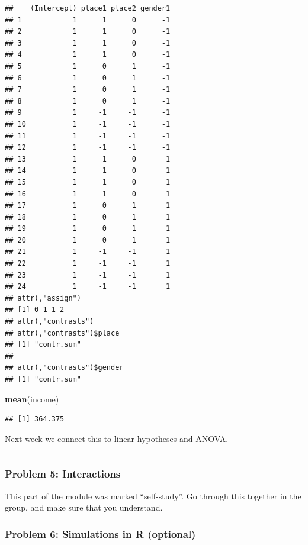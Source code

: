 \documentclass[
]{article}
\newenvironment{Shaded}{\begin{snugshade}}{\end{snugshade}}
\newcommand{\FunctionTok}[1]{\textcolor[rgb]{0.13,0.29,0.53}{\textbf{#1}}}
\newcommand{\NormalTok}[1]{#1}
\begin{document}
\begin{verbatim}
##    (Intercept) place1 place2 gender1
## 1            1      1      0      -1
## 2            1      1      0      -1
## 3            1      1      0      -1
## 4            1      1      0      -1
## 5            1      0      1      -1
## 6            1      0      1      -1
## 7            1      0      1      -1
## 8            1      0      1      -1
## 9            1     -1     -1      -1
## 10           1     -1     -1      -1
## 11           1     -1     -1      -1
## 12           1     -1     -1      -1
## 13           1      1      0       1
## 14           1      1      0       1
## 15           1      1      0       1
## 16           1      1      0       1
## 17           1      0      1       1
## 18           1      0      1       1
## 19           1      0      1       1
## 20           1      0      1       1
## 21           1     -1     -1       1
## 22           1     -1     -1       1
## 23           1     -1     -1       1
## 24           1     -1     -1       1
## attr(,"assign")
## [1] 0 1 1 2
## attr(,"contrasts")
## attr(,"contrasts")$place
## [1] "contr.sum"
## 
## attr(,"contrasts")$gender
## [1] "contr.sum"
\end{verbatim}

\begin{Shaded}
\begin{Highlighting}[]
\FunctionTok{mean}\NormalTok{(income)}
\end{Highlighting}
\end{Shaded}

\begin{verbatim}
## [1] 364.375
\end{verbatim}

Next week we connect this to linear hypotheses and ANOVA.

\begin{center}\rule{0.5\linewidth}{0.5pt}\end{center}

\hypertarget{problem-5-interactions}{%
\subsubsection{Problem 5: Interactions}\label{problem-5-interactions}}

This part of the module was marked ``self-study''. Go through this
together in the group, and make sure that you understand.

\hypertarget{problem-6-simulations-in-r-optional}{%
\subsubsection{Problem 6: Simulations in R
(optional)}\label{problem-6-simulations-in-r-optional}}
\end{document}
